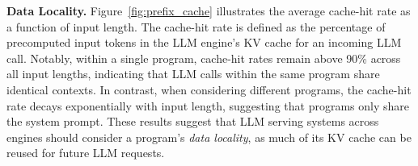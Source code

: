 \vspace{2mm}
\noindent \textbf{Data Locality.} Figure~\ref{fig:prefix_cache} illustrates the average cache-hit rate as a function of input length. The cache-hit rate is defined as the percentage of precomputed input tokens in the LLM engine's KV cache for an incoming LLM call. Notably, within a single program, cache-hit rates remain above 90\% across all input lengths, indicating that LLM calls within the same program share identical contexts. In contrast, when considering different programs, the cache-hit rate decays exponentially with input length, suggesting that programs only share the system prompt. These results suggest that LLM serving systems across engines should consider a program's \textit{data locality}, as much of its KV cache can be reused for future LLM requests.